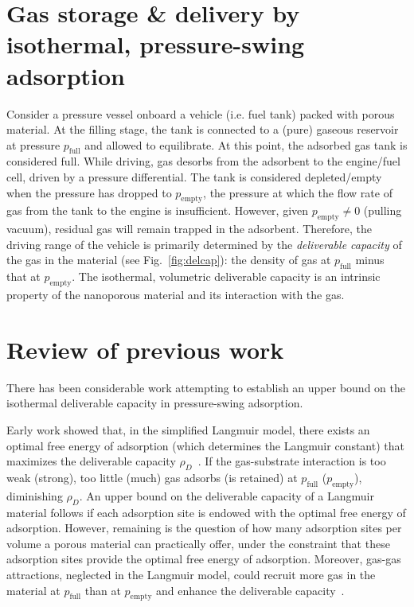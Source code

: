 \documentclass[twoside,twocolumn,9pt]{article}
\newcommand\pfull{\ensuremath{p_{\text{full}}}}
\newcommand\pempty{\ensuremath{p_{\text{empty}}}}
\begin{document}
\section{Gas storage \& delivery by isothermal, pressure-swing adsorption}
Consider a pressure vessel onboard a vehicle (i.e. fuel tank) packed with
porous material. At the filling stage, the tank is connected to a (pure)
gaseous reservoir at pressure $\pfull$ and allowed to equilibrate. At this
point, the adsorbed gas tank is considered full. While driving, gas desorbs
from the adsorbent to the engine/fuel cell, driven by a pressure differential.
The tank is considered depleted/empty when the pressure has dropped to
$\pempty$, the pressure at which the flow rate of gas from the tank to the
engine is insufficient. However, given $\pempty \neq 0$ (pulling vacuum),
residual gas will remain trapped in the adsorbent. Therefore, the driving range
of the vehicle is primarily determined by the \emph{deliverable capacity} of
the gas in the material (see Fig.~\ref{fig:delcap}): the density of gas at
$\pfull$ minus that at $\pempty$. The isothermal, volumetric deliverable
capacity is an intrinsic property of the nanoporous material and its
interaction with the gas.

\section{Review of previous work}
There has been considerable work attempting to establish an upper bound on the
isothermal deliverable capacity in pressure-swing adsorption.

Early work showed that, in the simplified Langmuir model, there exists an
optimal free energy of adsorption (which determines the Langmuir constant) that
maximizes the deliverable capacity
$\rho_D$~\cite{matranga1992storage,bhatia2006optimum,simon2014optimizing}. If
the gas-substrate interaction is too weak (strong), too little (much) gas
adsorbs (is retained) at $\pfull$ ($\pempty$), diminishing $\rho_D$. An upper
bound on the deliverable capacity of a Langmuir material follows if each
adsorption site is endowed with the optimal free energy of adsorption. However,
remaining is the question of how many adsorption sites per volume a porous
material can practically offer, under the constraint that these adsorption
sites provide the optimal free energy of adsorption. Moreover, gas-gas
attractions, neglected in the Langmuir model, could recruit more gas in the
material at $\pfull$ than at $\pempty$ and enhance the deliverable
capacity~\cite{simon2014optimizing}.
\end{document}
